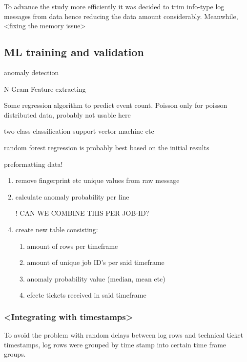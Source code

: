 To advance the study more efficiently
it was decided to trim info-type log messages from data
hence reducing the data amount considerably.
Meanwhile,
<fixing the memory issue>

\subsection{ML training and validation}\label{subsec:ml-training-and-validation}

\begin{itcomment}
    anomaly detection

    N-Gram Feature extracting

    Some regression algorithm to predict event count.
    Poisson only for poisson distributed data, probably not usable here

    two-class classification
    support vector machine etc

    random forest regression is probably best based on the initial results
\end{itcomment}

preformatting data! \\
\begin{enumerate}
    \item remove fingerprint etc unique values from raw message
    \item calculate anomaly probability per line
    \item [!] CAN WE COMBINE THIS PER JOB-ID?
    \item create new table consisting:
    \begin{enumerate}
        \item amount of rows per timeframe
        \item amount of unique job ID's per said timeframe
        \item anomaly probability value (median, mean etc)
        \item efecte tickets received in said timeframe
    \end{enumerate}
\end{enumerate}

\subsubsection*{<Integrating with timestamps>}
To avoid the problem with random delays
between log rows and technical ticket timestamps,
log rows were grouped by time stamp
into certain time frame groups.


